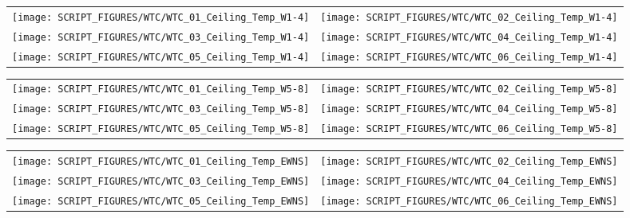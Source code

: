 \begin{figure}[p]
\begin{tabular*}{\textwidth}{l@{\extracolsep{\fill}}r}
\texttt{[image: SCRIPT\_FIGURES/WTC/WTC\_01\_Ceiling\_Temp\_W1-4]} &
\texttt{[image: SCRIPT\_FIGURES/WTC/WTC\_02\_Ceiling\_Temp\_W1-4]} \\
\texttt{[image: SCRIPT\_FIGURES/WTC/WTC\_03\_Ceiling\_Temp\_W1-4]} &
\texttt{[image: SCRIPT\_FIGURES/WTC/WTC\_04\_Ceiling\_Temp\_W1-4]} \\
\texttt{[image: SCRIPT\_FIGURES/WTC/WTC\_05\_Ceiling\_Temp\_W1-4]} &
\texttt{[image: SCRIPT\_FIGURES/WTC/WTC\_06\_Ceiling\_Temp\_W1-4]}
\end{tabular*}
\label{NIST_WTC_Ceiling_W1-4}
\end{figure}

\begin{figure}[p]
\begin{tabular*}{\textwidth}{l@{\extracolsep{\fill}}r}
\texttt{[image: SCRIPT\_FIGURES/WTC/WTC\_01\_Ceiling\_Temp\_W5-8]} &
\texttt{[image: SCRIPT\_FIGURES/WTC/WTC\_02\_Ceiling\_Temp\_W5-8]} \\
\texttt{[image: SCRIPT\_FIGURES/WTC/WTC\_03\_Ceiling\_Temp\_W5-8]} &
\texttt{[image: SCRIPT\_FIGURES/WTC/WTC\_04\_Ceiling\_Temp\_W5-8]} \\
\texttt{[image: SCRIPT\_FIGURES/WTC/WTC\_05\_Ceiling\_Temp\_W5-8]} &
\texttt{[image: SCRIPT\_FIGURES/WTC/WTC\_06\_Ceiling\_Temp\_W5-8]}
\end{tabular*}
\label{NIST_WTC_Ceiling_W5-8}
\end{figure}

\begin{figure}[p]
\begin{tabular*}{\textwidth}{l@{\extracolsep{\fill}}r}
\texttt{[image: SCRIPT\_FIGURES/WTC/WTC\_01\_Ceiling\_Temp\_EWNS]} &
\texttt{[image: SCRIPT\_FIGURES/WTC/WTC\_02\_Ceiling\_Temp\_EWNS]} \\
\texttt{[image: SCRIPT\_FIGURES/WTC/WTC\_03\_Ceiling\_Temp\_EWNS]} &
\texttt{[image: SCRIPT\_FIGURES/WTC/WTC\_04\_Ceiling\_Temp\_EWNS]} \\
\texttt{[image: SCRIPT\_FIGURES/WTC/WTC\_05\_Ceiling\_Temp\_EWNS]} &
\texttt{[image: SCRIPT\_FIGURES/WTC/WTC\_06\_Ceiling\_Temp\_EWNS]}
\end{tabular*}
\label{NIST_WTC_Ceiling_EWNS}
\end{figure}

